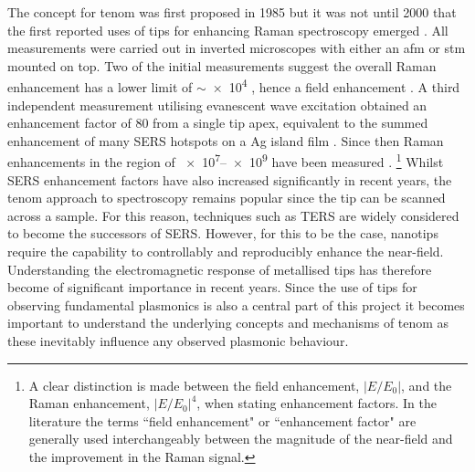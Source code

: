\documentclass{article}
\begin{document}
The concept for \gls{tenom} was first proposed in 1985 \cite{wessel1985} but it was not until 2000 that the first reported uses of tips for enhancing Raman spectroscopy emerged \cite{stockle2000, anderson2000, hayazawa2000, pettinger2000}. All measurements were carried out in inverted microscopes with either an \gls{afm} \cite{stockle2000, anderson2000, hayazawa2000} or \gls{stm} \cite{pettinger2000} mounted on top. Two of the initial measurements suggest the overall Raman enhancement has a lower limit of $\sim$\num{e4} \cite{stockle2000, anderson2000}, hence a field enhancement . A third independent measurement utilising evanescent wave excitation obtained an enhancement factor of 80 from a single tip apex, equivalent to the summed enhancement of many SERS hotspots on a Ag island film \cite{hayazawa2000}. Since then Raman enhancements in the region of \num{e7}--\num{e9} have been measured \cite{pettinger2012}.%
\footnote{A clear distinction is made between the field enhancement, $|E/E_0|$, and the Raman enhancement, $|E/E_0|^4$, when stating enhancement factors. In the literature the terms ``field enhancement" or ``enhancement factor" are generally used interchangeably between the magnitude of the near-field and the improvement in the Raman signal.}
Whilst SERS enhancement factors have also increased significantly in recent years, the \gls{tenom} approach to spectroscopy remains popular since the tip can be scanned across a sample. For this reason, techniques such as TERS are widely considered to become the successors of SERS. However, for this to be the case, nanotips require the capability to controllably and reproducibly enhance the near-field. Understanding the electromagnetic response of metallised tips has therefore become of significant importance in recent years.
Since the use of tips for observing fundamental plasmonics is also a central part of this project it becomes important to understand the underlying concepts and mechanisms of \gls{tenom} as these inevitably influence any observed plasmonic behaviour.
\end{document}
